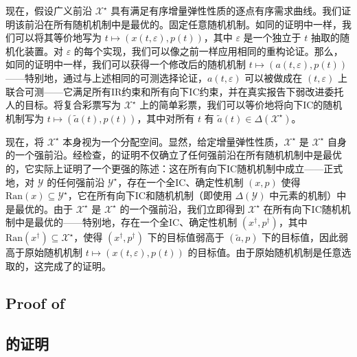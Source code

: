 \documentclass[12pt,letterpaper]{article}
\newenvironment{original}{\color{black}\noindent}{}
\newenvironment{translation}{\color{blue}\noindent}{}
\theoremstyle{plain}
\theoremstyle{definition}
\theoremstyle{remark}
\newcommand{\Y}{\mathcal{Y}}
\renewcommand{\1}{\mathds{1}}
\newcommand{\X}{\mathcal{X}}
\theoremstyle{definition}
\begin{document}
\begin{translation}
现在，假设广义前沿 $\X^\star$ 具有满足有序增量弹性性质的逐点有序需求曲线。我们证明该前沿在所有随机机制中是最优的。固定任意随机机制。如同的证明中一样，我们可以将其等价地写为 $t \mapsto (x(t, \varepsilon), p(t))$，其中 $\varepsilon$ 是一个独立于 $t$ 抽取的随机化装置。对 $\varepsilon$ 的每个实现，我们可以像之前一样应用相同的重构论证。那么，如同的证明中一样，我们可以获得一个修改后的随机机制 $t \mapsto (a(t, \varepsilon), p(t))$——特别地，通过与上述相同的可测选择论证，$a(t, \varepsilon)$ 可以被做成在 $(t, \varepsilon)$ 上联合可测——它满足所有IR约束和所有向下IC约束，并在真实报告下弱改进委托人的目标。将复合彩票写为 $\X^\star$ 上的简单彩票，我们可以等价地将向下IC的随机机制写为 $t \mapsto (\tilde{a}(t), p(t))$，其中对所有 $t$ 有 $\tilde{a}(t) \in \Delta(\X^\star)$。

现在，将 $\X^\star$ 本身视为一个分配空间。显然，给定增量弹性性质，$\X^\star$ 是 $\X^\star$ 自身的一个强前沿。经检查，的证明不仅确立了任何强前沿在所有随机机制中是最优的，它实际上证明了一个更强的陈述：这在所有向下IC随机机制中成立——正式地，对 $\Y$ 的任何强前沿 $\Y^\star$，存在一个全IC、确定性机制 $(x, p)$ 使得 $\text{Ran}(x) \subseteq \Y^\star$，它在所有向下IC和随机机制（即使用 $\Delta(\mathcal{Y})$ 中元素的机制）中是最优的。由于 $\X^\star$ 是 $\X^\star$ 的一个强前沿，我们立即得到 $\X^\star$ 在所有向下IC随机机制中是最优的——特别地，存在一个全IC、确定性机制 $(x^\dagger, p^\dagger)$，其中 $\text{Ran}(x^\dagger) \subseteq \X^\star$，使得 $(x^\dagger, p^\dagger)$ 下的目标值弱高于 $(\tilde{a}, p)$ 下的目标值，因此弱高于原始随机机制 $t \mapsto (x(t, \varepsilon), p(t))$ 的目标值。由于原始随机机制是任意选取的，这完成了的证明。
\end{translation}

\begin{original}
\subsection{Proof of }
\end{original}
\begin{translation}
\subsection{的证明}
\end{translation}
\end{document}

